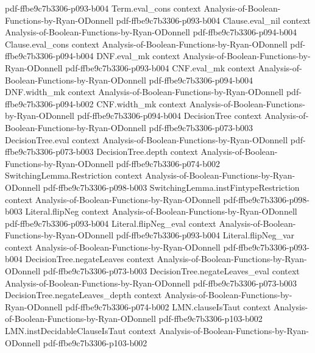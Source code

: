 \begin{lemma}
  {pdf-ffbe9c7b3306-p093-b004}
\proofstep
  {Term.eval_cons}
  {context}
  {Analysis-of-Boolean-Functions-by-Ryan-ODonnell}
  {pdf-ffbe9c7b3306-p093-b004}
\proofstep
  {Clause.eval_nil}
  {context}
  {Analysis-of-Boolean-Functions-by-Ryan-ODonnell}
  {pdf-ffbe9c7b3306-p094-b004}
\proofstep
  {Clause.eval_cons}
  {context}
  {Analysis-of-Boolean-Functions-by-Ryan-ODonnell}
  {pdf-ffbe9c7b3306-p094-b004}
\proofstep
  {DNF.eval_mk}
  {context}
  {Analysis-of-Boolean-Functions-by-Ryan-ODonnell}
  {pdf-ffbe9c7b3306-p093-b004}
\proofstep
  {CNF.eval_mk}
  {context}
  {Analysis-of-Boolean-Functions-by-Ryan-ODonnell}
  {pdf-ffbe9c7b3306-p094-b004}
\proofstep
  {DNF.width_mk}
  {context}
  {Analysis-of-Boolean-Functions-by-Ryan-ODonnell}
  {pdf-ffbe9c7b3306-p094-b002}
\proofstep
  {CNF.width_mk}
  {context}
  {Analysis-of-Boolean-Functions-by-Ryan-ODonnell}
  {pdf-ffbe9c7b3306-p094-b004}
\proofstep
  {DecisionTree}
  {context}
  {Analysis-of-Boolean-Functions-by-Ryan-ODonnell}
  {pdf-ffbe9c7b3306-p073-b003}
\proofstep
  {DecisionTree.eval}
  {context}
  {Analysis-of-Boolean-Functions-by-Ryan-ODonnell}
  {pdf-ffbe9c7b3306-p073-b003}
\proofstep
  {DecisionTree.depth}
  {context}
  {Analysis-of-Boolean-Functions-by-Ryan-ODonnell}
  {pdf-ffbe9c7b3306-p074-b002}
\proofstep
  {SwitchingLemma.Restriction}
  {context}
  {Analysis-of-Boolean-Functions-by-Ryan-ODonnell}
  {pdf-ffbe9c7b3306-p098-b003}
\proofstep
  {SwitchingLemma.instFintypeRestriction}
  {context}
  {Analysis-of-Boolean-Functions-by-Ryan-ODonnell}
  {pdf-ffbe9c7b3306-p098-b003}
\proofstep
  {Literal.flipNeg}
  {context}
  {Analysis-of-Boolean-Functions-by-Ryan-ODonnell}
  {pdf-ffbe9c7b3306-p093-b004}
\proofstep
  {Literal.flipNeg_eval}
  {context}
  {Analysis-of-Boolean-Functions-by-Ryan-ODonnell}
  {pdf-ffbe9c7b3306-p093-b004}
\proofstep
  {Literal.flipNeg_var}
  {context}
  {Analysis-of-Boolean-Functions-by-Ryan-ODonnell}
  {pdf-ffbe9c7b3306-p093-b004}
\proofstep
  {DecisionTree.negateLeaves}
  {context}
  {Analysis-of-Boolean-Functions-by-Ryan-ODonnell}
  {pdf-ffbe9c7b3306-p073-b003}
\proofstep
  {DecisionTree.negateLeaves_eval}
  {context}
  {Analysis-of-Boolean-Functions-by-Ryan-ODonnell}
  {pdf-ffbe9c7b3306-p073-b003}
\proofstep
  {DecisionTree.negateLeaves_depth}
  {context}
  {Analysis-of-Boolean-Functions-by-Ryan-ODonnell}
  {pdf-ffbe9c7b3306-p074-b002}
\proofstep
  {LMN.clauseIsTaut}
  {context}
  {Analysis-of-Boolean-Functions-by-Ryan-ODonnell}
  {pdf-ffbe9c7b3306-p103-b002}
\proofstep
  {LMN.instDecidableClauseIsTaut}
  {context}
  {Analysis-of-Boolean-Functions-by-Ryan-ODonnell}
  {pdf-ffbe9c7b3306-p103-b002}

\end{lemma}
